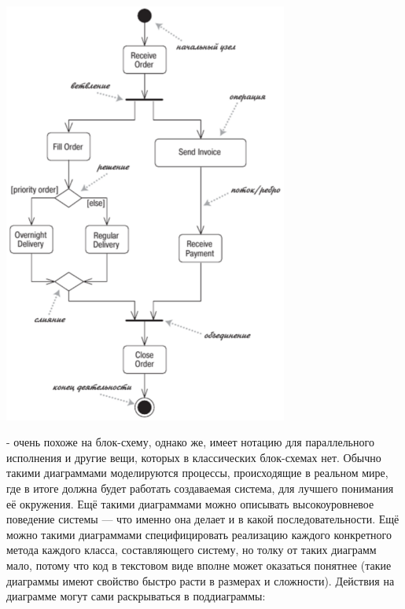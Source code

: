 \documentclass[a5paper]{article}
\begin{document}
\begin{center}
	\includegraphics[width=0.7\textwidth]{activityDiagram.png}
\end{center}

 - очень похоже на блок-схему, однако же, имеет нотацию для параллельного исполнения и другие вещи, которых в классических блок-схемах нет. Обычно такими диаграммами моделируются процессы, происходящие в реальном мире, где в итоге должна будет работать создаваемая система, для лучшего понимания её окружения. Ещё такими диаграммами можно описывать высокоуровневое поведение системы --- что именно она делает и в какой последовательности. Ещё можно такими диаграммами специфицировать реализацию каждого конкретного метода каждого класса, составляющего систему, но толку от таких диаграмм мало, потому что код в текстовом виде вполне может оказаться понятнее (такие диаграммы имеют свойство быстро расти в размерах и сложности). Действия на диаграмме могут сами раскрываться в поддиаграммы:
\end{document}
